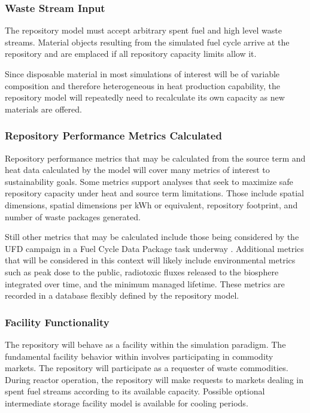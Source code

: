 \subsubsection{Waste Stream Input}

The repository model must accept arbitrary spent fuel and high level waste
streams.  Material objects resulting from the simulated fuel cycle arrive at 
the  repository and are emplaced if all repository capacity limits allow 
it.

Since disposable material in most simulations of interest will be of variable 
composition and therefore heterogeneous in heat production capability, the 
repository model will repeatedly need to recalculate its own capacity as 
new materials are offered.

\subsubsection{Repository Performance Metrics Calculated}

Repository performance metrics that may be calculated from the source 
term and heat data calculated by the model will cover many metrics of
interest to sustainability goals. Some metrics support analyses that
seek to maximize safe repository capacity under heat and source term limitations. 
Those include spatial dimensions, spatial dimensions per kWh or equivalent,
repository footprint, and number of waste packages generated.

Still other metrics that may be calculated include those being considered by 
the \gls{UFD} campaign in a Fuel Cycle Data Package task underway 
\cite{nutt_personal_2011}. Additional metrics that will be considered in this
context will likely include environmental metrics such as peak dose 
to the public, radiotoxic fluxes released to the biosphere integrated over time, 
and the minimum managed lifetime.  These metrics are recorded in a database 
flexibly defined by the repository model. 

\subsubsection{Facility Functionality}

The repository will behave as a facility within the \Cyclus simulation 
paradigm. The fundamental facility behavior within \Cyclus involves 
participating in commodity markets. The repository will participate as 
a requester of waste commodities. During reactor operation, the 
repository will make requests to markets dealing in spent fuel streams 
according to its available capacity. Possible optional intermediate storage facility 
model is available for cooling periods.

